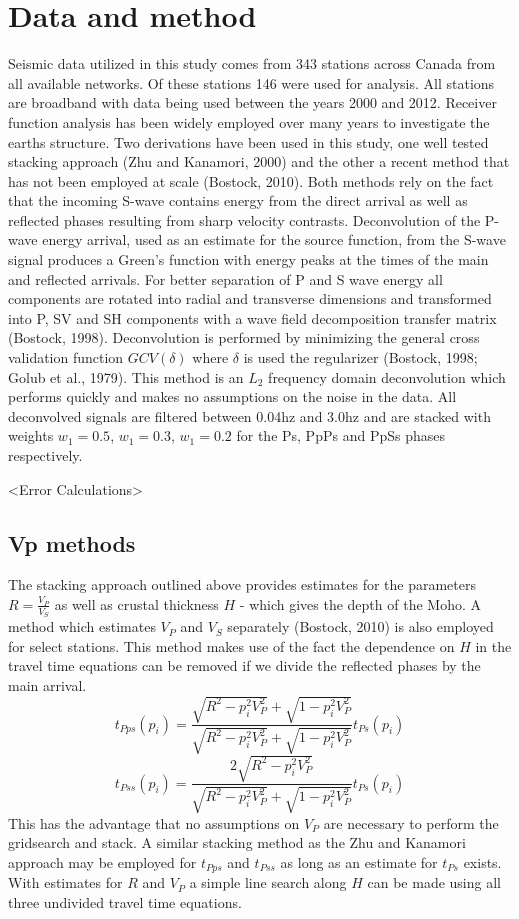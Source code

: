 \documentclass[draft]{article}
\begin{document}
\section{Data and method}
   Seismic data utilized in this study comes from 343 stations across Canada from all available networks. Of these stations 146 were used for analysis. All stations are broadband with data being used between the years 2000 and 2012. Receiver function analysis has been widely employed over many years to investigate the earths structure.
   Two derivations have been used in this study, one well tested stacking approach (Zhu and Kanamori, 2000) and the other a recent method that has not been employed at scale (Bostock, 2010). Both methods rely on the fact that the incoming S-wave contains energy from the direct arrival as well as reflected phases resulting from sharp velocity contrasts. Deconvolution of the P-wave energy arrival, used as an estimate for the source function, from the S-wave signal produces a Green's function with energy peaks at the times of the main and reflected arrivals. For better separation of P and S wave energy all components are rotated into radial and transverse dimensions and transformed into P, SV and SH components with a wave field decomposition transfer matrix (Bostock, 1998).
   Deconvolution is performed by minimizing the general cross validation function $GCV(\delta)$ where $\delta$ is used the regularizer (Bostock, 1998; Golub et al., 1979). This method is an $L_2$ frequency domain deconvolution which performs quickly and makes no assumptions on the noise in the data. All deconvolved signals are filtered between 0.04hz and 3.0hz and are stacked with weights $w_1=0.5$, $w_1=0.3$, $w_1=0.2$ for the Ps, PpPs and PpSs phases respectively.

   <Error Calculations>

\subsection{Vp methods}
   The stacking approach outlined above provides estimates for the parameters $R=\frac{V_P}{V_S}$ as well as crustal thickness $H$ - which gives the depth of the Moho. A method which estimates $V_P$ and $V_S$ separately (Bostock, 2010) is also employed for select stations. This method makes use of the fact the dependence on $H$ in the travel time equations can be removed if we divide the reflected phases by the main arrival.
$$ t_{Pps}(p_i) = \frac{ \sqrt{R^2-p_i^2V_P^2} + \sqrt{1-p_i^2V_P^2} } {\sqrt{R^2-p_i^2V_P^2} + \sqrt{1-p_i^2V_P^2} } t_{Ps}(p_i) $$
$$ t_{Pss}(p_i) = \frac{2\sqrt{R^2-p_i^2V_P^2}} {\sqrt{R^2-p_i^2V_P^2} + \sqrt{1-p_i^2V_P^2} } t_{Ps}(p_i) $$
This has the advantage that no assumptions on $V_P$ are necessary to perform the gridsearch and stack. A similar stacking method as the Zhu and Kanamori approach may be employed for $t_{Pps}$ and $t_{Pss}$ as long as an estimate for $t_{Ps}$ exists. With estimates for $R$ and $V_P$ a simple line search along $H$ can be made using all three undivided travel time equations.
\end{document}
